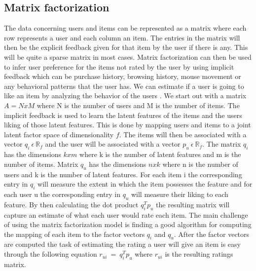 \subsection{Matrix factorization}\label{bsc::MF}
The data concerning users and items can be represented as a matrix where each row represents a user and each column an item.
The entries in the matrix will then be the explicit feedback given for that item by the user if there is any.
This will be quite a sparse matrix in most cases.
Matrix factorization can then be used to infer user preference for the items not rated by the user by using implicit feedback which can be purchase history, browsing history, mouse movement or any behavioral patterns that the user has.
We can estimate if a user is going to like an item by analyzing the behavior of the users \cite{Matrix-factorization-techniques}.
We start out with a matrix $A = N x M$ where N is the number of users and M is the number of items.
The implicit feedback is used to learn the latent features of the items and the users liking of those latent features.
This is done by mapping users and items to a joint latent factor space of dimensionality $f$.
The items will then be associated with a vector $q_i \: \epsilon \: \mathbb{R}_f$ and the user will be associated with a vector $p_u \: \epsilon \: \mathbb{R}_f$. 
The matrix $q_i$ has the dimensions $k x m$ where k is the number of latent features and m is the number of items.
Matrix $q_u$ has the dimensions $n x k$ where n is the number of users and k is the number of latent features.
For each item i the corresponding entry in $q_i$ will measure the extent in which the item possesses the feature and for each user u the corresponding entry in $q_u$ will measure their liking to each feature.
By then calculating the dot product $q_i^T p_u$ the resulting matrix will capture an estimate of what each user would rate each item. 
The main challenge of using the matrix factorization model is finding a good algorithm for computing the mapping of each item to the factor vectors $q_i$ and $q_u$.
After the factor vectors are computed the task of estimating the rating a user will give an item is easy through the following equation $r_{ui} \: = \: q_i^T p_u$ where $r_{ui}$ is the resulting ratings matrix.



